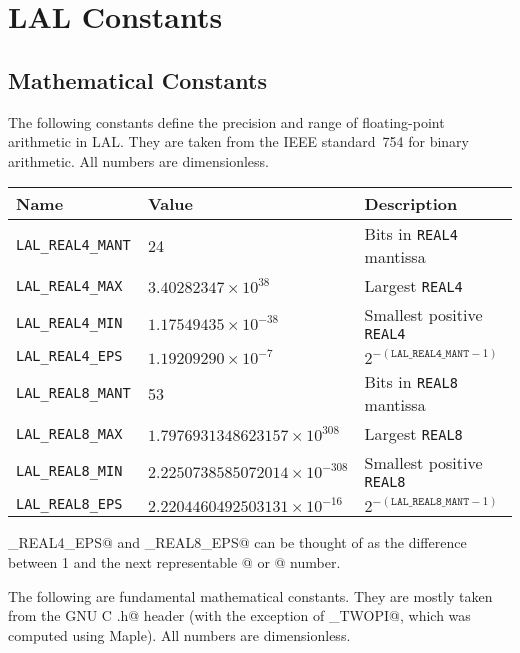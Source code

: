 \documentclass[10pt]{ligodcc}
\begin{document}
\section{LAL Constants}

\subsection{Mathematical Constants}

The following constants define the precision and range of
floating-point arithmetic in LAL.  They are taken from the IEEE
standard~754 for binary arithmetic.  All numbers are dimensionless.

\begin{center}
\begin{tabular}{|lll|}
\hline
Name & Value & Description \\
\hline
\tt LAL\_REAL4\_MANT & 24 &
        Bits in {\tt REAL4} mantissa \\
\tt LAL\_REAL4\_MAX  & $3.40282347\times10^{38}$ &
        Largest {\tt REAL4} \\
\tt LAL\_REAL4\_MIN  & $1.17549435\times10^{-38}$ &
        Smallest positive {\tt REAL4} \\
\tt LAL\_REAL4\_EPS  & $1.19209290\times10^{-7}$ &
        $2^{-(\mathtt{LAL\_REAL4\_MANT}-1)}$ \\
\hline
\tt LAL\_REAL8\_MANT & 53 &
        Bits in {\tt REAL8} mantissa \\
\tt LAL\_REAL8\_MAX  & $1.7976931348623157\times10^{308}$ &
        Largest {\tt REAL8} \\
\tt LAL\_REAL8\_MIN  & $2.2250738585072014\times10^{-308}$ &
        Smallest positive {\tt REAL8} \\
\tt LAL\_REAL8\_EPS  & $2.2204460492503131\times10^{-16}$ &
        $2^{-(\mathtt{LAL\_REAL8\_MANT}-1)}$ \\
\hline
\end{tabular}
\end{center}

\noindent\verb@LAL_REAL4_EPS@ and \verb@LAL_REAL8_EPS@ can be thought
of as the difference between 1 and the next representable @
or @ number.

\vspace{3ex}

The following are fundamental mathematical constants.  They are mostly
taken from the GNU C \verb@math.h@ header (with the exception of
\verb@LAL_TWOPI@, which was computed using Maple).  All numbers are
dimensionless.
\end{document}
